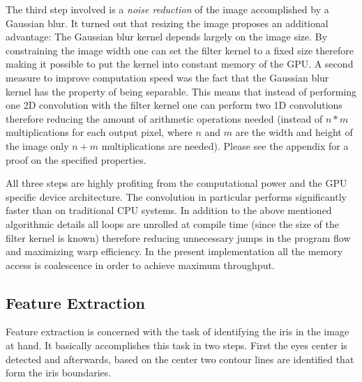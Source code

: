 \documentclass[journal]{IEEEtran}
\begin{document}
\par The third step involved is a \emph{noise reduction} of the image accomplished by a Gaussian blur. It turned out that resizing the image proposes an additional advantage: The Gaussian blur kernel depends largely on the image size. By constraining the image width one can set the filter kernel to a fixed size therefore making it possible to put the kernel into constant memory of the GPU. A second measure to improve computation speed was the fact that the Gaussian blur kernel has the property of being separable. This means that instead of performing one 2D convolution with the filter kernel one can perform two 1D convolutions therefore reducing the amount of arithmetic operations needed (instead of $n*m$ multiplications for each output pixel, where $n$ and $m$ are the width and height of the image only $n+m$ multiplications are needed)\cite{podlozhnyuk2007image}. Please see the appendix for a proof on the specified properties.
\par All three steps are highly profiting from the computational power and the GPU specific device architecture. The convolution in particular performs significantly faster than on traditional CPU systems. In addition to the above mentioned algorithmic details all loops are unrolled at compile time (since the size of the filter kernel is known) therefore reducing unnecessary jumps in the program flow and maximizing warp efficiency. In the present implementation all the memory access is coalescence in order to achieve maximum throughput.
\subsection{Feature Extraction}
Feature extraction is concerned with the task of identifying the iris in the image at hand. It basically accomplishes this task in two steps. First the eyes center is detected and afterwards, based on the center two contour lines are identified that form the iris boundaries.
\end{document}
